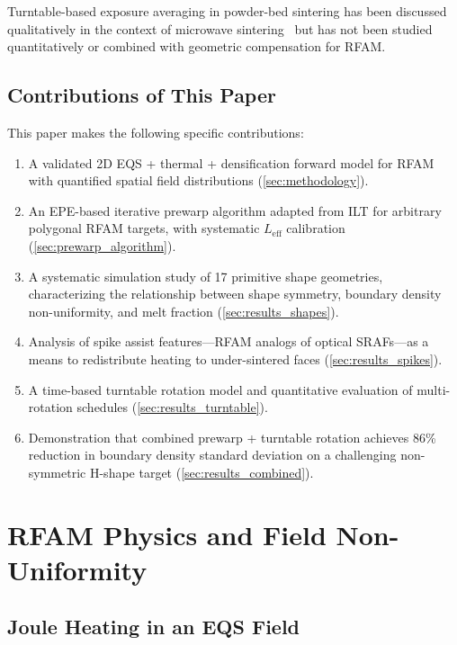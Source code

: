 \documentclass[10pt,twocolumn]{article}
\newcommand{\Leff}{L_{\mathrm{eff}}}
\begin{document}
Turntable-based exposure averaging in powder-bed sintering has been
discussed qualitatively in the context of microwave
sintering~\cite{Clark1996microwave} but has not been studied
quantitatively or combined with geometric compensation for RFAM.

\subsection{Contributions of This Paper}

This paper makes the following specific contributions:
\begin{enumerate}
\item A validated 2D EQS + thermal + densification forward model for
      RFAM with quantified spatial field distributions (\cref{sec:methodology}).
\item An EPE-based iterative prewarp algorithm adapted from ILT for
      arbitrary polygonal RFAM targets, with systematic $\Leff$
      calibration (\cref{sec:prewarp_algorithm}).
\item A systematic simulation study of 17 primitive shape geometries,
      characterizing the relationship between shape symmetry, boundary
      density non-uniformity, and melt fraction
      (\cref{sec:results_shapes}).
\item Analysis of spike assist features---RFAM analogs of
      optical SRAFs---as a means to redistribute heating to under-sintered
      faces (\cref{sec:results_spikes}).
\item A time-based turntable rotation model and quantitative evaluation
      of multi-rotation schedules (\cref{sec:results_turntable}).
\item Demonstration that combined prewarp + turntable rotation achieves
      86\% reduction in boundary density standard deviation on a
      challenging non-symmetric H-shape target
      (\cref{sec:results_combined}).
\end{enumerate}

\section{RFAM Physics and Field Non-Uniformity}
\label{sec:physics}

\subsection{Joule Heating in an EQS Field}
\end{document}
